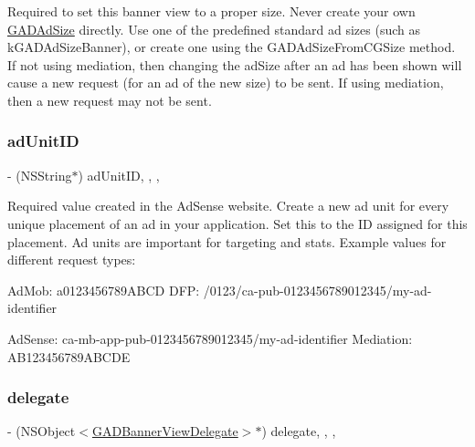 Required to set this banner view to a proper size. Never create your own \hyperlink{structGADAdSize}{G\+A\+D\+Ad\+Size} directly. Use one of the predefined standard ad sizes (such as k\+G\+A\+D\+Ad\+Size\+Banner), or create one using the G\+A\+D\+Ad\+Size\+From\+C\+G\+Size method. If not using mediation, then changing the ad\+Size after an ad has been shown will cause a new request (for an ad of the new size) to be sent. If using mediation, then a new request may not be sent. \mbox{\label{interfaceGADBannerView_aef7fb22ba623052ded92a496718b4a37}} 
\subsubsection{\texorpdfstring{ad\+Unit\+ID}{adUnitID}}
{\footnotesize\ttfamily -\/ (N\+S\+String$\ast$) ad\+Unit\+ID\hspace{0.3cm}{\ttfamily [read]}, {\ttfamily [write]}, {\ttfamily [nonatomic]}, {\ttfamily [copy]}}

Required value created in the Ad\+Sense website. Create a new ad unit for every unique placement of an ad in your application. Set this to the ID assigned for this placement. Ad units are important for targeting and stats. Example values for different request types\+: \begin{DoxyVerb}AdMob: a0123456789ABCD
  DFP: /0123/ca-pub-0123456789012345/my-ad-identifier
\end{DoxyVerb}
 Ad\+Sense\+: ca-\/mb-\/app-\/pub-\/0123456789012345/my-\/ad-\/identifier Mediation\+: A\+B123456789\+A\+B\+C\+DE \mbox{\label{interfaceGADBannerView_a7e52a5109dc6d9936303c73a74ce4e5a}} 
\subsubsection{\texorpdfstring{delegate}{delegate}}
{\footnotesize\ttfamily -\/ (N\+S\+Object$<$\hyperlink{protocolGADBannerViewDelegate-p}{G\+A\+D\+Banner\+View\+Delegate}$>$$\ast$) delegate\hspace{0.3cm}{\ttfamily [read]}, {\ttfamily [write]}, {\ttfamily [nonatomic]}, {\ttfamily [weak]}}

